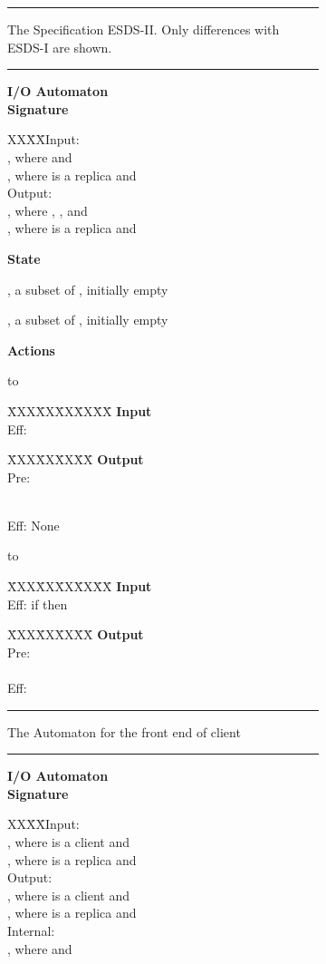 \documentclass[11pt]{article}
\newcommand{\bfg}{\begin{figure}}
\newcommand{\efg}{\end{figure}}
\def\ioisize{\footnotesize}
\newcommand{\ioi}[3]{\bgroup\ioisize \begin{tabbing}
XX\=XX\=    \kill           Input:\+ \\                 #1 \-  \\
Output: \+ \\
  #2 \- \\
Internal: \+\\
  #3 \-
\end{tabbing} \egroup}
\newcommand{\io}[2]{\bgroup\ioisize \begin{tabbing}
XX\=XX\=    \kill           Input:\+ \\                 #1 \-  \\
Output: \+ \\
  #2 \- 
\end{tabbing} \egroup}
\def\iocodesize{\scriptsize}
\newcommand{\iocode}[2]{\vspace{-15pt}\begin{center}\iocodesize
\begin{minipage}[t]{.475\linewidth}
\hbox to\linewidth{}
#1
\end{minipage}
\hspace{.01\linewidth} 
\begin{minipage}[t]{.475\linewidth}
\hbox to\linewidth{}
#2
\end{minipage}
\end{center}}
\newcommand{\ef}[2]{\begin{tabbing}         \= XXX\=XX\=XX\=XX\=XX\=   \kill
\protect #1\\
\>Eff: \+ \+ \>
   #2  \- \-
\end{tabbing}}
\newcommand{\prcef}[3]{\begin{tabbing}        \= XXX\=XX\=XX\=XX\=  \kill
\protect #1\\
\>Pre: \+ \+ \>
  #2  \-  \- \\ 
\>Eff: \+  \+ \>
  #3 \- \- 
\end{tabbing}}
\newcommand{\ioautomatontitle}[1]{\vspace{2ex} \noindent 
     \textbf{I/O Automaton #1}\\}
\newenvironment{signature}[1][Signature]{\noindent\textbf{#1}\iocodesize\vspace{0ex}}{}
\newenvironment{statevarlist}[1][State]
   {\noindent\textbf{#1}\iocodesize\vspace{0ex}
    \begin{list}{}{\topsep=2ex \itemsep=-0.5ex \leftmargin=0ex \labelwidth=0ex}}
   {\end{list}}
\newenvironment{actionlist}[1][Actions]{\vspace{1ex}\noindent\textbf{#1}\iocodesize}{}
\renewcommand{\iocode}[3][.475]{\vspace{-15pt}\begin{center}\iocodesize
\begin{minipage}[t]{#1\linewidth}
\hbox to\linewidth{}
#2
\end{minipage}
\hspace{.01\linewidth} 
\begin{minipage}[t]{.95\linewidth-#1\linewidth}
\hbox to\linewidth{}
#3
\end{minipage}
\end{center}}
\newcommand{\horline}{\rule{\textwidth}{1pt}}
\begin{document}
\begin{figure}[hb]
\begin{figure}[hb]
{}

\horline

\caption{The Specification ESDS-II. Only differences with ESDS-I are shown.}
\label{fig:ESDSII}
\efg



\bfg

\horline

\ioautomatontitle{}

\begin{signature}

\io{, 
	where  and  \\
, 
	where  is a replica and  
}{, 
	where , , and  \\ 
, 
	where  is a replica and 
}
\end{signature}



\begin{statevarlist}

\item , a subset of , initially empty 
\item , a subset of , initially empty 

\end{statevarlist}

\begin{actionlist}

\iocode{\ef{\textbf{Input} }
{
}

\prcef{\textbf{Output} }
{
}{None
}

}{

\ef{\textbf{Input} }
{if  then 
}

\prcef{\textbf{Output} }
{ \\
  
}{ \\
  
}
}

\end{actionlist}

\horline
\caption{The Automaton for the front end of client }
\label{fig:front-end}
\efg







\bfg

\horline
\ioautomatontitle{}

\begin{signature}

\ioi{, 
	where  is a client and  \\
, 
	where  is a replica and  
}{, 
	where  is a client and  \\
, 
	where  is a replica and  
}{, 
	where  and 
}
\end{signature}


\end{figure}
\end{figure}
\end{document}
